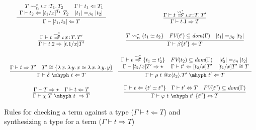 \documentclass{article}
\newcommand{\abs}[4]{{#1}\, #2\! : \! #3.\, #4}
\newcommand{\absu}[3]{{#1}\, #2.\, #3}
\newcommand{\leadstocs}[0]{\ensuremath{\leadsto_{\mathbf{n}}^*}}
\newcommand{\tpcheck}[0]{\Leftarrow}
\newcommand{\tpsynth}[0]{\Rightarrow}
\newcommand{\tpsynthleads}[0]{\ensuremath{\overset{\leadstocs}{\Rightarrow}}}
\begin{document}
\begin{figure}
\[\begin{array}{c}
\begin{array}{cc}
    \infer{\Gamma\vdash [ t_1 , t_2 ] \tpcheck T}
          {
           \begin{array}{cc}
             T \leadstocs \abs{\iota}{x}{T_1}{T_2}
             & \Gamma \vdash t_1 \tpcheck T_1
             \\ \Gamma \vdash t_2 \tpcheck [t_1/x]^{T_1}\ T_2
             & |t_1| =_{\beta\eta} |t_2|
           \end{array}
          } &
    \infer{\Gamma\vdash t.1 \tpsynth T}{\Gamma\vdash t \tpsynthleads \abs{\iota}{x}{T}{T'}} \\ \\
    \infer{\Gamma\vdash t.2 \tpsynth [t.1/x] T'}{\Gamma\vdash t \tpsynthleads \abs{\iota}{x}{T}{T'}} &
    \infer{\Gamma\vdash \beta\{t'\} \tpcheck T}
          {T \leadstocs \{t_1 \simeq t_2\} \quad \textit{FV}(t')\subseteq \textit{dom}(\Gamma) \quad |t_1| =_{\beta\eta} |t_2|}  \\ \\    
    \infer{\Gamma\vdash \delta\ \mhyph\ t \tpcheck T}
          {
            \Gamma \vdash t \tpsynth T'
            \quad T' \cong \{\absu{\lambda}{x}{\absu{\lambda}{y}{x}} \simeq \absu{\lambda}{x}{\absu{\lambda}{y}{y}}\}
          } &
    \infer{\Gamma \vdash \rho\ t\ @x\langle t_2 \rangle.T'\ \mhyph\ t' \tpcheck T}
          {
          \begin{array}{ccc}
            \Gamma \vdash t \tpsynthleads \{t_1 \simeq t_2'\}
            & \textit{FV}(t_2) \subseteq \textit{dom}(\Gamma)
            & |t_2'| =_{\beta\eta} |t_2|
            \\ \Gamma \vdash [t_2/x] T' \tpsynth \star
            & \Gamma \vdash t' \tpcheck [t_2/x]T'
            & [t_1/x]T' \cong T
          \end{array}
          } \\ \\
    \infer{\Gamma \vdash \chi\ T\ \mhyph\ t\ \tpsynth T}
          {\Gamma \vdash T \tpsynth \star & \Gamma \vdash t \tpcheck T} &
    \infer{\Gamma\vdash \varphi\ t\ \mhyph\ t'\ \{t''\} \Leftrightarrow T}
          {
              \Gamma\vdash t\tpcheck \{t' \simeq t''\}
              & \Gamma\vdash t' \Leftrightarrow T
              & \textit{FV}(t'') \subseteq \textit{dom}(\Gamma)
          }
  \end{array}
    \end{array}
  \]
\caption{Rules for checking a term against a type ($\Gamma \vdash t \tpcheck T$)
           and synthesizing a type for a term ($\Gamma \vdash t \tpsynth T$)}
\label{fig:tp}
\end{figure}
\end{document}
